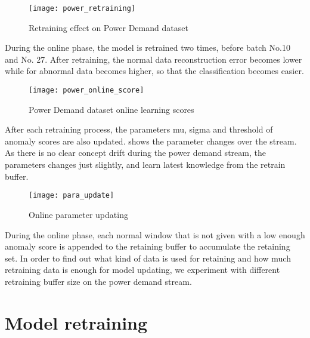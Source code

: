 \begin{figure}[h]
\centering
\texttt{[image: power\_retraining]}
\caption[Retraining effect on Power Demand dataset]{Retraining effect on Power Demand dataset}
\label{fig:power_retraining}
\end{figure}

During the online phase, the model is retrained two times, before batch No.10 and No. 27. After retraining, the normal data reconstruction error becomes lower while for abnormal data becomes higher, so that the classification becomes easier.

\begin{figure}[h]
\centering
\texttt{[image: power\_online\_score]}
\caption[Power Demand dataset online learning scores]{Power Demand dataset online learning scores}
\label{fig:power_online}
\end{figure}

After each retraining process, the parameters mu, sigma and threshold of anomaly scores are also updated.  shows the parameter changes over the stream. As there is no clear concept drift during the power demand stream, the parameters changes just slightly, and learn latest knowledge from the retrain buffer. 

\begin{figure}[h]
\centering
\texttt{[image: para\_update]}
\caption[Online parameter updating]{Online parameter updating}
\label{fig:parachanges}
\end{figure}

During the online phase, each normal window that is not given with a low enough anomaly score is appended to the retaining buffer to accumulate the retaining set. In order to find out what kind of data is used for retaining and how much retraining data is enough for model updating, we experiment with different retraining buffer size on the power demand stream.




\section{Model retraining}
\label{sec:retraining}

